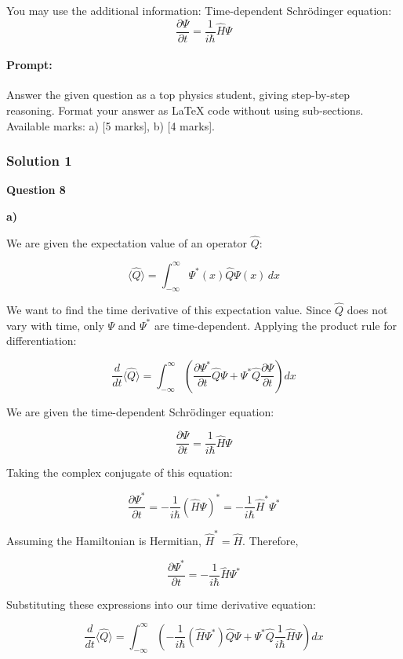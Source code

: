 \documentclass{article}
\begin{document}
You may use the additional information:  
Time-dependent Schrödinger equation:  
\[
\frac{\partial \Psi}{\partial t} = \frac{1}{i\hbar} \hat{H} \Psi
\]


\paragraph{Prompt: \\} 
Answer the given question as a top physics student, giving step-by-step reasoning. Format your answer as LaTeX code without using sub-sections. Available marks: a) [5 marks], b) [4 marks].


\subsubsection{Solution 1}

\textbf{Question 8}

\textbf{a)}

We are given the expectation value of an operator $\hat{Q}$:

\[
\langle \hat{Q} \rangle = \int_{-\infty}^{\infty} \Psi^*(x) \hat{Q} \Psi(x) \, dx
\]

We want to find the time derivative of this expectation value. Since $\hat{Q}$ does not vary with time, only $\Psi$ and $\Psi^*$ are time-dependent. Applying the product rule for differentiation:

\[
\frac{d}{dt} \langle \hat{Q} \rangle = \int_{-\infty}^{\infty} \left( \frac{\partial \Psi^*}{\partial t} \hat{Q} \Psi + \Psi^* \hat{Q} \frac{\partial \Psi}{\partial t} \right) dx
\]

We are given the time-dependent Schrödinger equation:

\[
\frac{\partial \Psi}{\partial t} = \frac{1}{i\hbar} \hat{H} \Psi
\]

Taking the complex conjugate of this equation:

\[
\frac{\partial \Psi^*}{\partial t} = -\frac{1}{i\hbar} (\hat{H} \Psi)^* = -\frac{1}{i\hbar} \hat{H}^* \Psi^*
\]

Assuming the Hamiltonian is Hermitian, $\hat{H}^* = \hat{H}$. Therefore,

\[
\frac{\partial \Psi^*}{\partial t} = -\frac{1}{i\hbar} \hat{H} \Psi^*
\]

Substituting these expressions into our time derivative equation:

\[
\frac{d}{dt} \langle \hat{Q} \rangle = \int_{-\infty}^{\infty} \left( -\frac{1}{i\hbar} (\hat{H} \Psi^*) \hat{Q} \Psi + \Psi^* \hat{Q} \frac{1}{i\hbar} \hat{H} \Psi \right) dx
\]
\end{document}
